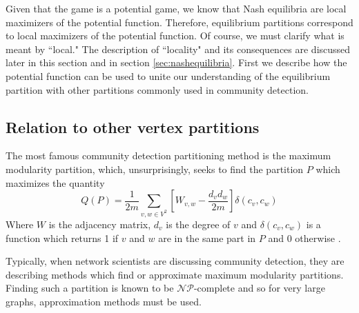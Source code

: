 \documentclass{article}
\begin{document}
Given that the game is a potential game, we know that Nash equilibria are local maximizers of the potential function. Therefore, equilibrium partitions correspond to local maximizers of the potential function. Of course, we must clarify what is meant by ``local." The description of ``locality" and its consequences are discussed later in this section and in section \ref{sec:nashequilibria}. First we describe how the potential function can be used to unite our understanding of the equilibrium partition with other partitions commonly used in community detection.  

\subsection{Relation to other vertex partitions}

The most famous community detection partitioning method is the maximum modularity partition, which, unsurprisingly, seeks to find the partition $P$ which maximizes the quantity 
\[Q(P)=\frac{1}{2m}\sum_{v,w\in V^2}\left[W_{v,w}-\frac{d_vd_w}{2m}\right]\delta(c_v,c_w)\]
Where $W$ is the adjacency matrix, $d_v$ is the degree of $v$ and $\delta(c_v,c_w)$ is a function which returns 1 if $v$ and $w$ are in the same part in $P$ and $0$ otherwise \citep{Clauset2004}.

Typically, when network scientists are discussing community detection, they are describing methods which find or approximate maximum modularity partitions. Finding such a partition is known to be $\mathcal{NP}$-complete \citep{Brandes2006} and so for very large graphs, approximation methods must be used.
\end{document}
